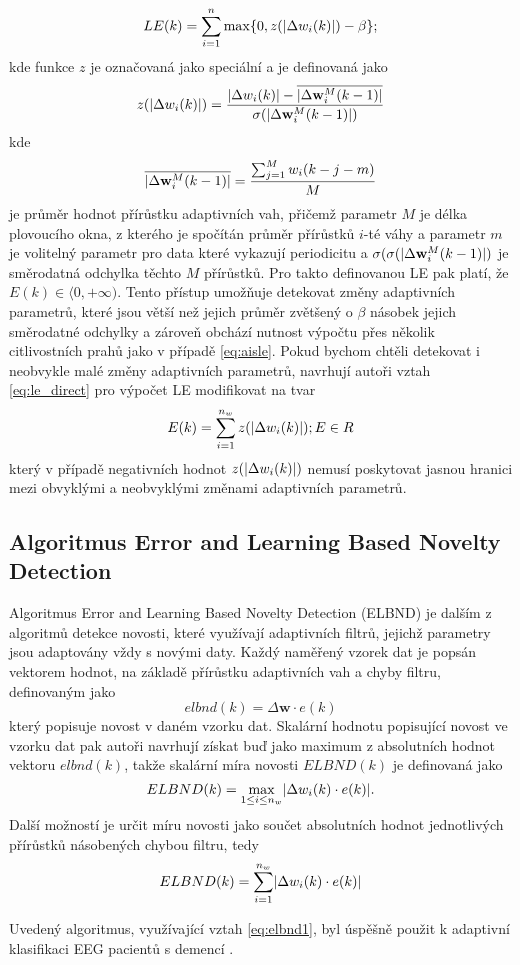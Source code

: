 \begin{equation}\label{eq:le_direct}
LE(k)=\sum_{i=1}^n \max \{0,z(\lvert\Delta w_i(k)\rvert)-\beta \};
\end{equation}
kde funkce $z$ je označovaná jako speciální  a je definovaná jako
\begin{equation}
z(\lvert\Delta w_i(k)\rvert) = \frac{\lvert\Delta w_i(k)\rvert-\overline{\lvert\Delta\textbf{w}_i^M(k-1)\rvert}}{\sigma(\lvert\Delta \textbf{w}_i^M(k-1)\rvert)}
\end{equation}
kde
\begin{equation}
\overline{\lvert\Delta \textbf{w}_i^M(k-1)\rvert}=\frac{\sum_{j=1}^M w_i(k-j-m)}{M}
\end{equation} 
je průměr hodnot přírůstku adaptivních vah, přičemž parametr $M$ je délka plovoucího okna, z kterého je spočítán průměr přírůstků $i$-té váhy a parametr $m$ je volitelný parametr pro data které vykazují periodicitu a $\sigma(\sigma(\lvert\Delta \textbf{w}_i^M(k-1)\rvert)$ je směrodatná odchylka těchto $M$ přírůstků. Pro takto definovanou LE pak platí, že $E(k)\in \langle0,+\infty)$. Tento přístup umožňuje detekovat změny adaptivních parametrů, které jsou větší než jejich průměr zvětšený o $\beta$ násobek jejich směrodatné odchylky a zároveň obchází nutnost výpočtu přes několik citlivostních prahů jako v případě \ref{eq:aisle}. Pokud bychom chtěli detekovat i neobvykle malé změny adaptivních parametrů, navrhují autoři vztah  \ref{eq:le_direct} pro výpočet LE  modifikovat na tvar
\begin{equation}\label{eq:le_direct_padasip}
E(k)=\sum_{i=1}^{n_w}z(\lvert\Delta w_i(k)\rvert); E \in R
\end{equation}
který v případě negativních hodnot $z(\lvert\Delta w_i(k)\rvert)$ nemusí poskytovat jasnou hranici mezi obvyklými a neobvyklými změnami adaptivních parametrů.
\subsection{Algoritmus Error and Learning Based Novelty Detection}\label{chap:elbnd}
Algoritmus Error and Learning Based Novelty Detection (ELBND) \cite{elbnd1,elbnd2} je dalším z algoritmů detekce novosti, které využívají adaptivních filtrů, jejichž parametry jsou adaptovány vždy s novými daty. Každý naměřený vzorek dat je popsán vektorem hodnot, na základě přírůstku adaptivních vah a chyby filtru, definovaným jako
\begin{equation}
	elbnd(k)=\Delta\textbf{w}\cdot e(k)
\end{equation}
který popisuje novost v daném vzorku dat. Skalární hodnotu popisující novost ve vzorku dat pak autoři navrhují získat buď jako maximum z absolutních hodnot vektoru $elbnd(k)$, takže skalární míra novosti $ELBND(k)$ je definovaná jako
\begin{equation}\label{eq:elbnd1}
ELBND(k) = \max_{1\leq i \leq n_w} \lvert\Delta w_i(k) \cdot e(k)\rvert.
\end{equation}
Další možností je určit míru novosti jako součet absolutních hodnot jednotlivých přírůstků násobených chybou filtru, tedy
\begin{equation}\label{eq:elbnd2}
	ELBND(k)=\sum_{i=1}^{n_w}\lvert\Delta w_i(k)\cdot e(k)\rvert
\end{equation}

Uvedený algoritmus, využívající vztah \ref{eq:elbnd1}, byl úspěšně použit k adaptivní klasifikaci EEG pacientů s demencí \cite{elbnd3}.

